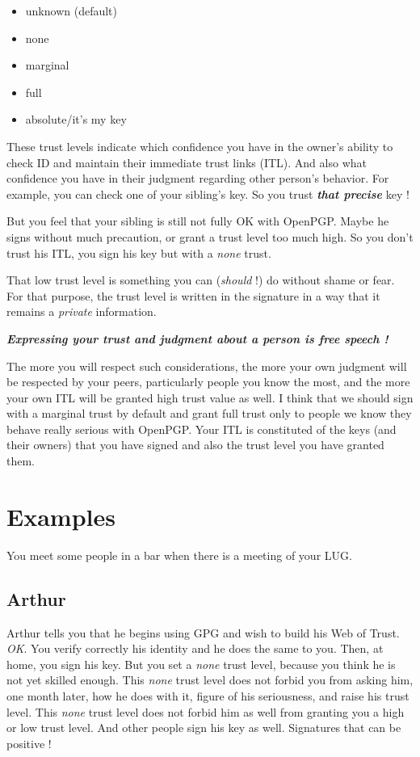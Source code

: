 \begin{itemize}
\itemsep1pt\parskip0pt
\item
  unknown (default)
\item
  none
\item
  marginal
\item
  full
\item
  absolute/it's my key
\end{itemize}

These trust levels indicate which confidence you have in the owner's ability to check ID and maintain their immediate trust links (ITL). And
also what confidence you have in their judgment regarding other person's behavior. For example, you can check one of your sibling's key. So you trust \textbf{\emph{that precise}} key !

But you feel that your sibling is still not fully OK with OpenPGP. Maybe he signs without much precaution, or grant a trust level too much high. So you don't trust his ITL, you sign his key but with a \emph{none} trust.

That low trust level is something you can (\emph{should} !) do without shame or fear. For that purpose, the trust level is written in the
signature in a way that it remains a \emph{private} information.

\textbf{\emph{Expressing your trust and judgment about a person is free speech !}}

The more you will respect such considerations, the more your own judgment will be respected by your peers, particularly people you know
the most, and the more your own ITL will be granted high trust value as well. I think that we should sign with a marginal trust by default and grant full trust only to people we know they behave really serious with OpenPGP. Your ITL is constituted of the keys (and their owners) that you have signed and also the trust level you have granted them.

\section{Examples}\label{examples}

You meet some people in a bar when there is a meeting of your LUG.

\subsection{Arthur}\label{arthur}

Arthur tells you that he begins using GPG and wish to build his Web of Trust. \emph{OK}. You verify correctly his identity and he does the
same to you. Then, at home, you sign his key. But you set a \emph{none} trust level, because you think he is not yet skilled enough. This \emph{none} trust level does not forbid you from asking him, one month later, how he does with it, figure of his seriousness, and raise
his trust level. This \emph{none} trust level does not forbid him as well from granting you a high or low trust level. And other people sign his key as well.
Signatures that can be positive !\\

